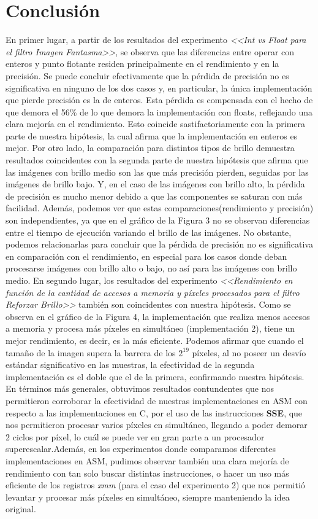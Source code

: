 \documentclass[a4paper]{article}
\begin{document}
\section{Conclusión}
\justify
En primer lugar, a partir de los resultados del experimento \textit{<<Int vs Float para el filtro Imagen Fantasma>>}, se observa que las diferencias  entre operar con enteros y punto flotante residen principalmente en el rendimiento y en la precisión. Se puede concluir efectivamente que la pérdida de precisión no es significativa en ninguno de los dos casos y, en particular, la única implementación que pierde precisión es la de enteros. Esta pérdida es compensada con el hecho de que demora el 56\% de lo que demora la implementación con floats, reflejando una clara mejoría en el rendimiento. Esto coincide sastifactoriamente con la primera parte de nuestra hipótesis, la cual afirma que la implementación en enteros es mejor.
\justify
Por otro lado, la comparación para distintos tipos de brillo demuestra resultados coincidentes con la segunda parte de nuestra hipótesis que afirma que las imágenes con brillo medio son las que más precisión pierden, seguidas por las imágenes de brillo bajo. Y, en el caso de las imágenes con brillo alto, la pérdida de precisión es mucho menor debido a que las componentes se saturan con más facilidad. Además, podemos ver que estas comparaciones(rendimiento y precisión) son independientes, ya que en el gráfico de la Figura 3 no se observan diferencias entre el tiempo de ejecución variando el brillo de las imágenes. No obstante, podemos relacionarlas para concluir que la pérdida de precisión no es significativa en comparación con el rendimiento, en especial para los casos donde deban procesarse imágenes con brillo alto o bajo, no así para las imágenes con brillo medio. 
\justify
En segundo lugar, los resultados del experimento \textit{<<Rendimiento en función de la cantidad de accesos a memoria y píxeles procesados para el filtro Reforzar Brillo>>} también son coincidentes con nuestra hipótesis. Como se observa en el gráfico de la Figura 4, la implementación que realiza menos accesos a memoria y procesa más píxeles en simultáneo (implementación 2), tiene un mejor rendimiento, es decir, es la más eficiente. Podemos afirmar que cuando el tamaño de la imagen supera la barrera de los $2^{19}$ píxeles, al no poseer un desvío estándar significativo en las muestras, la efectividad de la segunda implementación es el doble que el de la primera, confirmando nuestra hipótesis. 
\justify
En términos más generales, obtuvimos resultados contundentes que nos permitieron corroborar la efectividad de nuestras implementaciones en ASM con respecto a las implementaciones en C, por el uso de las instrucciones \textbf{SSE}, que nos permitieron procesar varios píxeles en simultáneo, llegando a poder demorar 2 ciclos por píxel, lo cuál se puede ver en gran parte a un procesador superescalar.Además, en los experimentos donde comparamos diferentes implementaciones en ASM, pudimos observar también una clara mejoría de rendimiento con tan solo buscar distintas instrucciones, o hacer un uso más eficiente de los registros \textit{xmm} (para el caso del experimento 2) que nos permitió levantar y procesar más píxeles en simultáneo, siempre manteniendo la idea original. 
\end{document}
